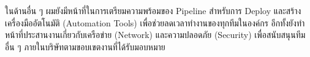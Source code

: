 ในด้านอื่น ๆ ผมยังมีหน้าที่ในการเตรียมความพร้อมของ Pipeline สำหรับการ Deploy และสร้างเครื่องมืออัตโนมัติ (Automation Tools) เพื่อช่วยลดเวลาทำงานของทุกทีมในองค์กร อีกทั้งยังทำหน้าที่ประสานงานเกี่ยวกับเครือข่าย (Network) และความปลอดภัย (Security) เพื่อสนับสนุนทีมอื่น ๆ ภายในบริษัทตามขอบเขตงานที่ได้รับมอบหมาย









